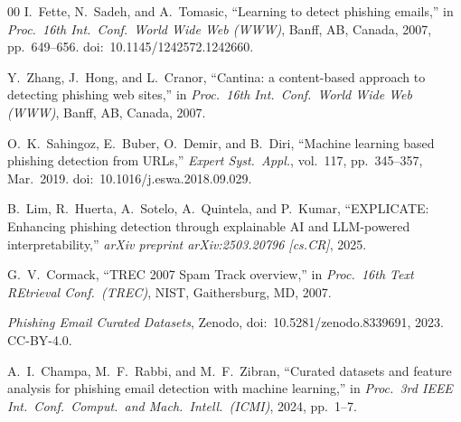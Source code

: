 \documentclass[conference]{IEEEtran}
\begin{document}
\begin{thebibliography}{00}
 I.~Fette, N.~Sadeh, and A.~Tomasic, ``Learning to detect
phishing emails,'' in \textit{Proc.\ 16th Int.\ Conf.\ World Wide Web (WWW)},
Banff, AB, Canada, 2007, pp.\ 649--656.
doi:\ 10.1145/1242572.1242660.

 Y.~Zhang, J.~Hong, and L.~Cranor, ``Cantina: a content-based
approach to detecting phishing web sites,'' in \textit{Proc.\ 16th Int.\ Conf.\
World Wide Web (WWW)}, Banff, AB, Canada, 2007.

 O.~K.~Sahingoz, E.~Buber, O.~Demir, and B.~Diri,
``Machine learning based phishing detection from URLs,''
\textit{Expert Syst.\ Appl.}, vol.\ 117, pp.\ 345--357, Mar.\ 2019.
doi:\ 10.1016/j.eswa.2018.09.029.

 B.~Lim, R.~Huerta, A.~Sotelo, A.~Quintela, and P.~Kumar,
``EXPLICATE: Enhancing phishing detection through explainable AI and
LLM-powered interpretability,'' \textit{arXiv preprint arXiv:2503.20796
[cs.CR]}, 2025.

 G.~V.~Cormack, ``TREC 2007 Spam Track overview,'' in
\textit{Proc.\ 16th Text REtrieval Conf.\ (TREC)}, NIST, Gaithersburg, MD,
2007.

 \textit{Phishing Email Curated Datasets}, Zenodo,
doi:\ 10.5281/zenodo.8339691, 2023. {CC-BY-4.0}.

 A.~I.~Champa, M.~F.~Rabbi, and M.~F.~Zibran,
``Curated datasets and feature analysis for phishing email detection with
machine learning,'' in \textit{Proc.\ 3rd IEEE Int.\ Conf.\ Comput.\ and
Mach.\ Intell.\ (ICMI)}, 2024, pp.\ 1--7.
\end{thebibliography}
\end{document}
